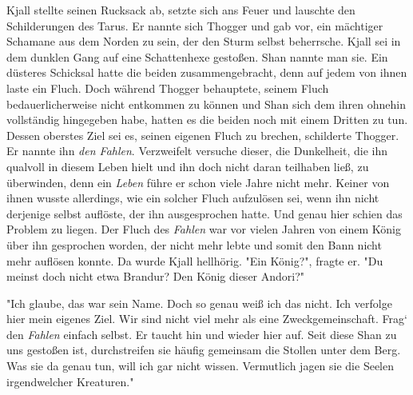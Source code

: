 \documentclass[10pt, a4paper, oneside]{book}
\begin{document}
\begin{multicols}{2}
Kjall stellte seinen Rucksack ab, setzte sich ans Feuer und lauschte den Schilderungen des Tarus. Er nannte sich Thogger und gab vor, ein mächtiger Schamane aus dem Norden zu sein, der den Sturm selbst beherrsche. Kjall sei in dem dunklen Gang auf eine Schattenhexe gestoßen. Shan nannte man sie. Ein düsteres Schicksal hatte die beiden zusammengebracht, denn auf jedem von ihnen laste ein Fluch. Doch während Thogger behauptete, seinem Fluch bedauerlicherweise nicht entkommen zu können und Shan sich dem ihren ohnehin vollständig hingegeben habe, hatten es die beiden noch mit einem Dritten zu tun. Dessen oberstes Ziel sei es, seinen eigenen Fluch zu brechen, schilderte Thogger. Er nannte ihn \textit{den Fahlen}. Verzweifelt versuche dieser, die Dunkelheit, die ihn qualvoll in diesem Leben hielt und ihn doch nicht daran teilhaben ließ, zu überwinden, denn ein \textit{Leben} führe er schon viele Jahre nicht mehr. Keiner von ihnen wusste allerdings, wie ein solcher Fluch aufzulösen sei, wenn ihn nicht derjenige selbst auflöste, der ihn ausgesprochen hatte. Und genau hier schien das Problem zu liegen. Der Fluch des \textit{Fahlen} war vor vielen Jahren von einem König über ihn gesprochen worden, der nicht mehr lebte und somit den Bann nicht mehr auflösen konnte. Da wurde Kjall hellhörig. "Ein König?", fragte er. "Du meinst doch nicht etwa Brandur? Den König dieser Andori?"\bigskip

"Ich glaube, das war sein Name. Doch so genau weiß ich das nicht. Ich verfolge hier mein eigenes Ziel. Wir sind nicht viel mehr als eine Zweckgemeinschaft. Frag‘ den \textit{Fahlen} einfach selbst. Er taucht hin und wieder hier auf. Seit diese Shan zu uns gestoßen ist, durchstreifen sie häufig gemeinsam die Stollen unter dem Berg. Was sie da genau tun, will ich gar nicht wissen. Vermutlich jagen sie die Seelen irgendwelcher Kreaturen."\bigskip


\end{multicols}
\end{document}
